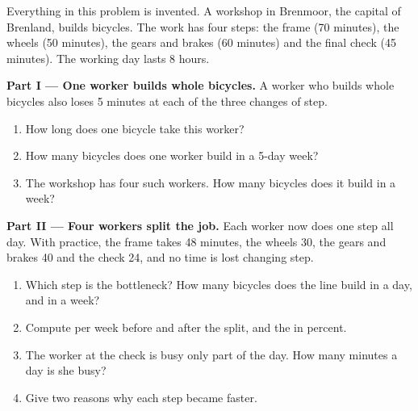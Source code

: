 \begin{problem}
\label{pb:g7:specialisation:1}
Everything in this problem is invented. A workshop in Brenmoor, the capital of
Brenland, builds bicycles. The work has four steps: the frame (70 minutes), the wheels
(50 minutes), the gears and brakes (60 minutes) and the final check (45 minutes). The
working day lasts 8 hours.

\medskip
\noindent\textbf{Part I --- One worker builds whole bicycles.} A worker who builds
whole bicycles also loses 5 minutes at each of the three changes of step.
\begin{enumerate}
  \item How long does one bicycle take this worker?
  \item How many bicycles does one worker build in a 5-day week?
  \item The workshop has four such workers. How many bicycles does it build in a week?
\end{enumerate}

\medskip
\noindent\textbf{Part II --- Four workers split the job.} Each worker now does one step
all day. With practice, the frame takes 48 minutes, the wheels 30, the gears and
brakes 40 and the check 24, and no time is lost changing step.
\begin{enumerate}[resume]
  \item Which step is the bottleneck? How many bicycles does the line build in a day,
        and in a week?
  \item Compute  per week before and after the split, and the  in percent.
  \item The worker at the check is busy only part of the day. How many minutes a day
        is she busy?
  \item Give two reasons why each step became faster.
\end{enumerate}


\end{problem}
